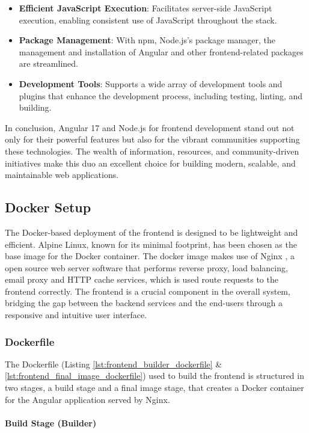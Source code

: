 \begin{itemize}
    \item \textbf{Efficient JavaScript Execution}: Facilitates server-side JavaScript execution, enabling consistent use of JavaScript throughout the stack.
    \item \textbf{Package Management}: With npm, Node.js's package manager, the management and installation of Angular and other frontend-related packages are streamlined.
    \item \textbf{Development Tools}: Supports a wide array of development tools and plugins that enhance the development process, including testing, linting, and building.
\end{itemize}

In conclusion, Angular 17 and Node.js for frontend development stand out not only for their powerful features but also for the vibrant communities supporting these technologies. The wealth of information, resources, and community-driven initiatives make this duo an excellent choice for building modern, scalable, and maintainable web applications.

\subsection{Docker Setup}

The Docker-based deployment of the frontend is designed to be lightweight and efficient. Alpine Linux, known for its minimal footprint, has been chosen as the base image for the Docker container. The docker image makes use of Nginx \cite{NGINX}, a open source web server software that performs reverse proxy, load balancing, email proxy and HTTP cache services, which is used route requests to the frontend correctly. The frontend is a crucial component in the overall system, bridging the gap between the backend services and the end-users through a responsive and intuitive user interface.

\subsubsection{Dockerfile}

The Dockerfile (Listing \ref{lst:frontend_builder_dockerfile} \& \ref{lst:frontend_final_image_dockerfile}) used to build the frontend is structured in two stages, a build stage and a final image stage, that creates a Docker container for the Angular application served by Nginx.

\paragraph{Build Stage (Builder)}

